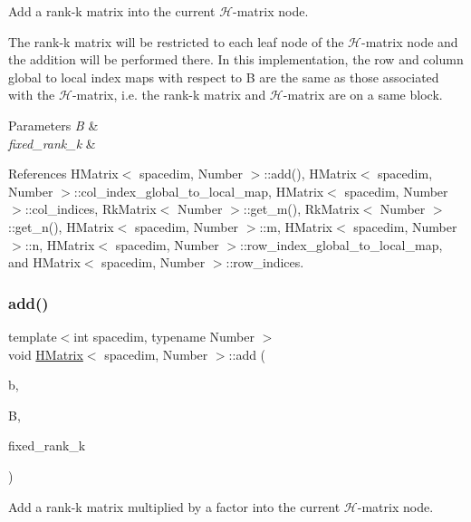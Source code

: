 Add a rank-\/k matrix into the current $\mathcal{H}$-\/matrix node.

The rank-\/k matrix will be restricted to each leaf node of the $\mathcal{H}$-\/matrix node and the addition will be performed there. In this implementation, the row and column global to local index maps with respect to {\ttfamily B} are the same as those associated with the $\mathcal{H}$-\/matrix, i.\+e. the rank-\/k matrix and $\mathcal{H}$-\/matrix are on a same block.


\begin{DoxyParams}{Parameters}
{\em B} & \\
\hline
{\em fixed\+\_\+rank\+\_\+k} & \\
\hline
\end{DoxyParams}


References H\+Matrix$<$ spacedim, Number $>$\+::add(), H\+Matrix$<$ spacedim, Number $>$\+::col\+\_\+index\+\_\+global\+\_\+to\+\_\+local\+\_\+map, H\+Matrix$<$ spacedim, Number $>$\+::col\+\_\+indices, Rk\+Matrix$<$ Number $>$\+::get\+\_\+m(), Rk\+Matrix$<$ Number $>$\+::get\+\_\+n(), H\+Matrix$<$ spacedim, Number $>$\+::m, H\+Matrix$<$ spacedim, Number $>$\+::n, H\+Matrix$<$ spacedim, Number $>$\+::row\+\_\+index\+\_\+global\+\_\+to\+\_\+local\+\_\+map, and H\+Matrix$<$ spacedim, Number $>$\+::row\+\_\+indices.

\mbox{\label{classHMatrix_a94981e45b7d9aa0f2afae77d414f1c1a}} 
\subsubsection{\texorpdfstring{add()}{add()}\hspace{0.1cm}{\footnotesize\ttfamily [8/10]}}
{\footnotesize\ttfamily template$<$int spacedim, typename Number $>$ \\
void \hyperlink{classHMatrix}{H\+Matrix}$<$ spacedim, Number $>$\+::add (\begin{DoxyParamCaption}\item[{const Number}]{b,  }\item[{const \hyperlink{classRkMatrix}{Rk\+Matrix}$<$ Number $>$ \&}]{B,  }\item[{const \hyperlink{classHMatrix_a5ca8dc549783d38371a01ecd621ecb34}{size\+\_\+type}}]{fixed\+\_\+rank\+\_\+k }\end{DoxyParamCaption})}

Add a rank-\/k matrix multiplied by a factor into the current $\mathcal{H}$-\/matrix node.

